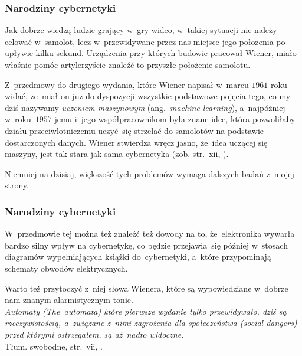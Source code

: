 \documentclass[10pt,t]{beamer}
\begin{document}
\begin{frame}
  \frametitle{Narodziny cybernetyki}


  Jak dobrze wiedzą ludzie grający w~gry wideo, w~takiej sytuacji nie
  należy celować w~samolot, lecz w~przewidywane przez nas miejsce jego
  położenia po upływie kilku sekund. Urządzenia przy których budowie
  pracował Wiener, miało właśnie pomóc artylerzyście znaleźć to przyszłe
  położenie samolotu.

  Z~przedmowy do drugiego wydania, które Wiener napisał w~marcu $1961$ roku
  widać, że~miał on już do dyspozycji wszystkie podstawowe pojęcia tego,
  co my dziś nazywamy \textit{uczeniem maszynowym} (ang.~\textit{machine
    learning}), a~najpóźniej w~roku~$1957$ jemu i~jego współpracownikom
  była znane idee, która pozwoliłaby działu przeciwlotniczemu uczyć~się
  strzelać do samolotów na podstawie dostarczonych danych. Wiener stwierdza
  wręcz jasno, że~idea uczącej się maszyny, jest tak stara jak sama
  cybernetyka (zob. str.~xii,
  \parencite{Wiener-Cybernetics-Second-edition-Pub-2016}).

  Niemniej na dzisiaj, większość tych problemów wymaga dalszych badań
  z~mojej strony.

\end{frame}





\begin{frame}
  \frametitle{Narodziny cybernetyki}


  W~przedmowie tej można też znaleźć też dowody na to, że~elektronika
  wywarła bardzo silny wpływ na cybernetykę, co będzie przejawia~się
  później w~stosach diagramów wypełniających książki do~cybernetyki,
  a~które przypominają schematy obwodów elektrycznych.

  Warto też przytoczyć z~niej słowa Wienera, które są wypowiedziane
  w~dobrze nam znanym alarmistycznym tonie. \\
  \textit{Automaty (\textit{The~automata}) które pierwsze wydanie tylko
    przewidywało, dziś są rzeczywistością, a~związane z~nimi zagrożenia dla
    społeczeństwa (\textit{social dangers}) przed którymi ostrzegałem, są
    aż~nadto widoczne.} \\
  Tłum. swobodne, str.~vii,
  \parencite{Wiener-Cybernetics-Second-edition-Pub-2016}.

\end{frame}
\end{document}
